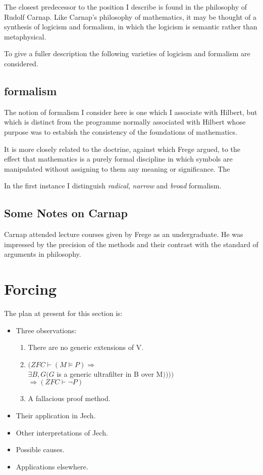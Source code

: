 \documentclass[10pt,titlepage]{article}
\begin{document}
The closest predecessor to the position I describe is found in the philosophy of Rudolf Carnap.
Like Carnap's philosophy of mathematics, it may be thought of a synthesis of logicism and formalism, in which the logicism is semantic rather than metaphysical.

To give a fuller description the following varieties of logicism and formalism are considered.

\subsection{formalism}

The notion of formalism I consider here is one which I associate with Hilbert, but which is distinct from the programme normally associated with Hilbert whose purpose was to estabish the consistency of the foundations of mathematics.

It is more closely related to the doctrine, against which Frege argued, to the effect that mathematics is a purely formal discipline in which symbols are manipulated without assigning to them any meaning or significance.
The

In the first instance I distinguish \emph{radical}, \emph{narrow} and \emph{broad} formalism. 

\subsection{Some Notes on Carnap}

Carnap attended lecture courses given by Frege as an undergraduate.
He was impressed by the precision of the methods and their contrast with the standard of arguments in philosophy.

\section{Forcing}

The plan at present for this section is:

\begin{itemize}
\item Three observations:

\begin{enumerate}
\item There are no generic extensions of V. 
\item $(ZFC \vdash (M \models P) \Rightarrow$\\
  $\exists B, G (G$ is a generic ultrafilter in B over M$))))$\\
  $\Rightarrow (ZFC \vdash \lnot P)$
\item A fallacious proof method.
\end{enumerate}

\item Their application in Jech.
\item Other interpretations of Jech.
\item Possible causes.
\item Applications elsewhere.
\end{itemize}
\end{document}
